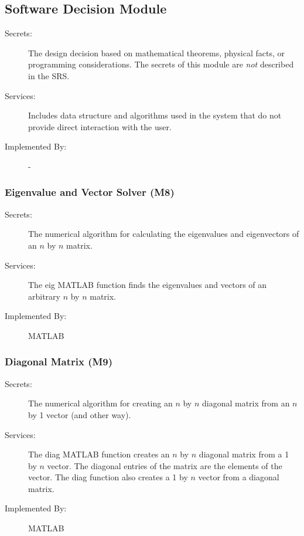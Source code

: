 \documentclass[12pt, titlepage]{article}
\begin{document}
	\subsection{Software Decision Module}
	
	\begin{description}
		\item[Secrets:] The design decision based on mathematical theorems, 
		physical
		facts, or programming considerations. The secrets of this module are
		\emph{not} described in the SRS.
		\item[Services:] Includes data structure and algorithms used in the 
		system that
		do not provide direct interaction with the user. 
		\item[Implemented By:] -
	\end{description}
	
	\subsubsection{Eigenvalue and Vector Solver (M8)} 
	
	\begin{description}
		\item[Secrets:] The numerical algorithm for calculating the eigenvalues 
		and 
		eigenvectors of an 
		$n$ by $n$ matrix.
		\item[Services:] The eig MATLAB function finds the eigenvalues and 
		vectors 
		of an 
		arbitrary $n$ by $n$ matrix.
		\item[Implemented By:] MATLAB
	\end{description} 
	
	\subsubsection{Diagonal Matrix (M9)} 
	
	\begin{description}
		\item[Secrets:] The numerical algorithm for creating an $n$ by $n$ 
		diagonal 
		matrix from an $n$ by 1 vector (and other way). 
		\item[Services:] The diag MATLAB function creates an $n$ by $n$ 
		diagonal 
		matrix 
		from a 1 by $n$ vector. The diagonal entries of the matrix are the 
		elements 
		of the vector. The 
		diag function also creates a 1 by $n$ vector from a diagonal
		matrix. 
		\item[Implemented By:] MATLAB
	\end{description} 
	
\end{document}
